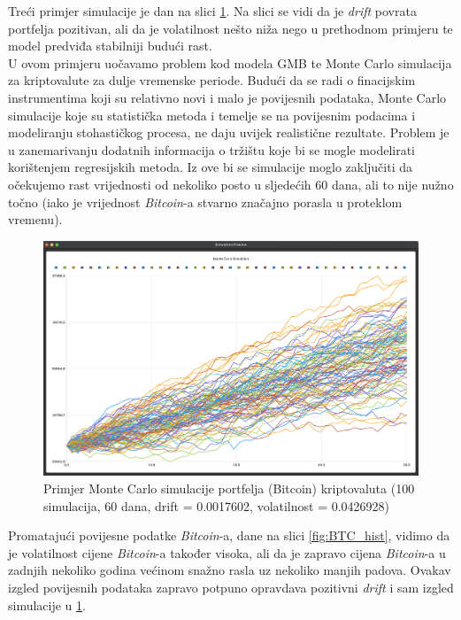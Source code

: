 \documentclass[zavrsnirad, upload]{fer}
\begin{document}
Treći primjer simulacije je dan na slici \ref{fig:monte_carlo_example3}.
Na slici se vidi da je \textit{drift} povrata portfelja pozitivan,
ali da je volatilnost nešto niža nego u prethodnom primjeru te model
predviđa stabilniji budući rast.\\
U ovom primjeru uočavamo problem kod modela GMB te Monte Carlo simulacija za
kriptovalute za dulje vremenske periode.
Budući da se radi o finacijskim instrumentima koji su
relativno novi i malo je povijesnih podataka,
Monte Carlo simulacije koje su statistička metoda i temelje se
na povijesnim podacima i modeliranju stohastičkog procesa,
ne daju uvijek
realistične rezultate. Problem je u zanemarivanju dodatnih
informacija o tržištu koje bi se mogle modelirati korištenjem
regresijskih metoda.
Iz ove bi se simulacije moglo zaključiti da očekujemo rast vrijednosti
od nekoliko posto u sljedećih 60 dana, ali to nije nužno točno
(iako je vrijednost \textit{Bitcoin}-a stvarno značajno porasla u proteklom vremenu).
\begin{figure}[H]
    \centering
    \includegraphics[width=1.0\textwidth]{Figures/monte_carlo_example3.png}
    \caption{Primjer Monte Carlo simulacije portfelja (Bitcoin) kriptovaluta (100
    simulacija, 60 dana, drift = 0.0017602, volatilnost = 0.0426928)}
    \label{fig:monte_carlo_example3}
\end{figure}
Promatajući povijesne podatke \textit{Bitcoin}-a, dane na slici \ref{fig:BTC_hist},
vidimo da je volatilnost cijene \textit{Bitcoin}-a također visoka, ali da je
zapravo cijena \textit{Bitcoin}-a u zadnjih nekoliko godina većinom snažno
rasla uz nekoliko manjih padova. Ovakav izgled povijesnih podataka
zapravo potpuno opravdava pozitivni \textit{drift} i sam izgled
simulacije u \ref{fig:monte_carlo_example3}.
\end{document}
